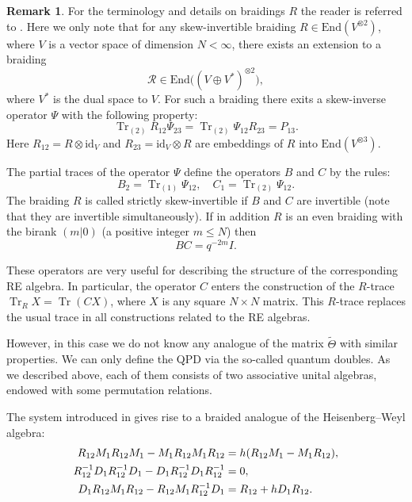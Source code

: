 \documentclass[11pt]{article}
\DeclareMathOperator{\Tr}{Tr}
\newcommand{\ot}{\otimes}
\newcommand{\tatt}{\widetilde{\Theta}}
\numberwithin{equation}{section}
\theoremstyle{plain}
\theoremstyle{definition}
\newtheorem{remark}[theorem]{Remark}
\begin{document}
\begin{remark}
For the terminology and details on braidings $R$ the reader is referred to \cite{GPS1}. Here we only note that for any
skew-invertible braiding $R\in \mathrm{End}(V^{\otimes 2})$, where $V$ is a vector space of dimension $N<\infty$,
there exists an extension to a braiding
\[
\mathcal{R}\in \mathrm{End}\big((V\oplus  V^*)^{\ot 2}\big),
\]
where $V^*$ is the dual space to $V$. For such a braiding there exits a skew-inverse operator $\Psi$ with the
following property:
\begin{equation}
\Tr_{(2)}R_{12}\Psi_{23} = \Tr_{(2)}\Psi_{12}R_{23} = P_{13}.
\label{def-psi}
\end{equation}
Here $R_{12} = R\otimes \mathrm{id}_V$ and $R_{23} = \mathrm{id}_V\otimes R$ are embeddings of $R$ into
$\mathrm{End}(V^{\otimes 3})$.

The partial traces of the operator $\Psi$ define the operators $B$ and $C$ by the rules:
\[
B_2 = \Tr_{(1)}\Psi_{12}, \quad C_1 = \Tr_{(2)}\Psi_{12}.
\]
The braiding $R$ is called strictly skew-invertible if $B$ and  $C$ are invertible (note that they are invertible simultaneously). If in addition $R$ is an even
braiding with the birank $(m|0)$ (a positive integer $m\le N$) then
\[
BC = q^{-2m}I.
\]

These operators are very useful for describing the structure of the corresponding RE algebra. In particular, the operator $C$ enters
the construction of the $R$-trace $\Tr_R X=\Tr (C X)$, where $X$ is any square $N\times N$ matrix. This $R$-trace replaces the
usual trace in all constructions related to the RE algebras.
\end{remark}

However, in this case  we do not know any analogue of the matrix $\tatt$ with similar properties.
We can only define the QPD  via the so-called quantum doubles. As we described above,
each of them consists of two associative  unital algebras, endowed with some permutation relations.

The system introduced in \cite{GPS2} gives rise to a braided analogue of the Heisenberg--Weyl algebra:
\begin{align}
R_{12}M_1R_{12}M_1-M_1R_{12}M_1R_{12}
&=h(R_{12}M_1-M_1R_{12}), \notag\\
R_{12}^{-1}D_1R_{12}^{-1}D_1-D_1R_{12}^{-1}D_1R_{12}^{-1}
&=0, \label{q-Weyl}\\
D_1R_{12}M_1R_{12}-R_{12}M_1R_{12}^{-1}D_1
&=R_{12}+hD_1R_{12}. \notag
\end{align}
\end{document}
